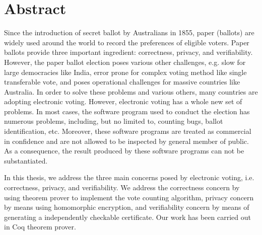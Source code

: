 \chapter*{Abstract}
\setlength{\parindent}{2em}
\setlength{\parskip}{1em}



Since the introduction of secret ballot by Australians in 1855, 
paper (ballots) are widely used around the world to record 
the preferences of eligible voters. Paper ballots provide three 
important ingredient: correctness, privacy, and verifiability. 
However, the paper ballot election poses various  other challenges, e.g. 
slow for large democracies like India,  error prone for complex voting method 
like single transferable vote, and poses operational challenges for 
massive countries like Australia. In order to solve these problems and various others, 
many countries are adopting electronic voting. However, 
electronic voting has a whole new set of problems. In most cases, the software 
program used to conduct the election has numerous problems, including, but no limited to, 
counting bugs, ballot identification, etc. Moreover, 
these software programs are treated as commercial in confidence and 
are not allowed to be inspected by general member of public. 
As a consequence, the result produced by these software programs 
can not be substantiated.

In this thesis, we address the three main concerns posed by electronic voting, i.e. 
correctness, privacy, and verifiability. We address the correctness concern by using 
theorem prover to implement the vote counting algorithm, 
privacy concern by means using homomorphic encryption, and verifiability concern 
by means of generating a independently checkable certificate.  Our work 
has been carried out in Coq theorem prover.

